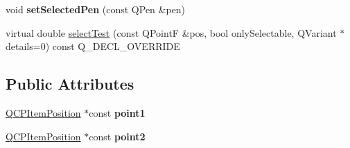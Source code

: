 \begin{DoxyCompactItemize}
\item 
void {\bfseries set\+Selected\+Pen} (const Q\+Pen \&pen)\hypertarget{class_q_c_p_item_straight_line_a5c33559498d33543fa95cf0a36e851ff}{}\label{class_q_c_p_item_straight_line_a5c33559498d33543fa95cf0a36e851ff}

\item 
virtual double \hyperlink{class_q_c_p_item_straight_line_ab5058792781373379db1c3ddd3462576}{select\+Test} (const Q\+PointF \&pos, bool only\+Selectable, Q\+Variant $\ast$details=0) const Q\+\_\+\+D\+E\+C\+L\+\_\+\+O\+V\+E\+R\+R\+I\+DE
\end{DoxyCompactItemize}
\subsection*{Public Attributes}
\begin{DoxyCompactItemize}
\item 
\hyperlink{class_q_c_p_item_position}{Q\+C\+P\+Item\+Position} $\ast$const {\bfseries point1}\hypertarget{class_q_c_p_item_straight_line_a4017e13e9c5a7540d2eb570a46e2e377}{}\label{class_q_c_p_item_straight_line_a4017e13e9c5a7540d2eb570a46e2e377}

\item 
\hyperlink{class_q_c_p_item_position}{Q\+C\+P\+Item\+Position} $\ast$const {\bfseries point2}\hypertarget{class_q_c_p_item_straight_line_a6e8cabe7bc886bb2a374cb69f4468f34}{}\label{class_q_c_p_item_straight_line_a6e8cabe7bc886bb2a374cb69f4468f34}

\end{DoxyCompactItemize}
